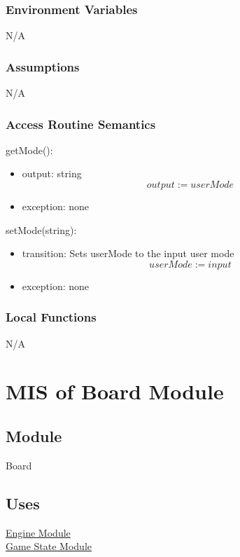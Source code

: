 \documentclass[12pt, titlepage]{article}
\begin{document}
    \subsubsection{Environment Variables}
    N/A

    \subsubsection{Assumptions}
    N/A

    \subsubsection{Access Routine Semantics}
        \noindent getMode():
        \begin{itemize}
            \item output: string 
                \[output := userMode\]
            \item exception: none
        \end{itemize}

        \noindent setMode(string):
        \begin{itemize}
            \item transition: Sets userMode to the input user mode 
                \[userMode := input\]
            \item exception: none
        \end{itemize}

    \subsubsection{Local Functions}
    N/A

    \newpage

\section{MIS of Board Module} \label{mBoard}

    \subsection{Module}
    Board

    \subsection{Uses}
    \hyperref[mEngine]{Engine Module}\\
    \hyperref[mGame]{Game State Module}
\end{document}
